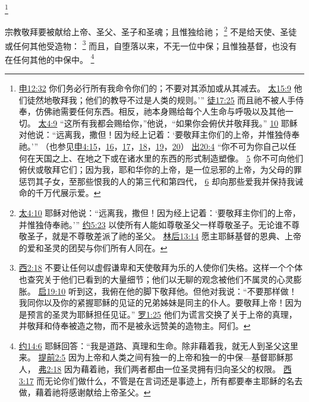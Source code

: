 \documentclass[12pt, a4paper, oneside]{ctexart}
\newcounter{parnum}[section]
\newcommand{\N}{%
   \noindent\refstepcounter{parnum}%
    \makebox[\parindent][l]{\textbf{\arabic{parnum}.}}}
\begin{document}
	\footnote {
		\href{https://biblehub.com/deuteronomy/12-32.htm}{申12:32} 你们务必行所有我命令你们的；不要对其添加或从其减去。
		\href{https://biblehub.com/matthew/15-9.htm}{太15:9} 他们徒然地敬拜我；他们的教导不过是人类的规则。’”
		\href{https://biblehub.com/acts/17-25.htm}{徒17:25} 而且祂不被人手侍奉，仿佛祂需要任何东西。相反，祂本身赐给每个人生命与呼吸以及其他一切。
		\href{https://biblehub.com/matthew/4-9.htm}{太4:9} “这所有我都会赐给你，”他说，“如果你会俯伏并敬拜我。”
		\href{https://biblehub.com/matthew/4-10.htm}{10} 耶稣对他说：“远离我，撒但！因为经上记着：‘要敬拜主你们的上帝，并惟独侍奉祂。’”
		（也参见\href{https://biblehub.com/deuteronomy/4-15.htm}{申4:15}，\href{https://biblehub.com/deuteronomy/4-16.htm}{16}，\href{https://biblehub.com/deuteronomy/4-17.htm}{17}，\href{https://biblehub.com/deuteronomy/4-18.htm}{18}，\href{https://biblehub.com/deuteronomy/4-19.htm}{19}，\href{https://biblehub.com/deuteronomy/4-20.htm}{20}）
		\href{https://biblehub.com/exodus/20-4.htm}{出20:4} “你不可为你自己以任何在天国之上、在地之下或在诸水里的东西的形式制造塑像。
		\href{https://biblehub.com/exodus/20-5.htm}{5} 你不可向他们俯伏或敬拜它们；因为我，耶和华你的上帝，是一位忌邪的上帝，为父母的罪惩罚其子女，至那些恨我的人的第三代和第四代，
		\href{https://biblehub.com/exodus/20-6.htm}{6} 却向那些爱我并保持我诫命的千万代展示爱。
	}

\N 宗教敬拜要被献给上帝、圣父、圣子和圣魂；且惟独给祂；
	\footnote {
		\href{https://biblehub.com/matthew/4-10.htm}{太4:10} 耶稣对他说：“远离我，撒但！因为经上记着：‘要敬拜主你们的上帝，并惟独侍奉祂。’”
		\href{https://biblehub.com/john/5-23.htm}{约5:23} 以使所有人能如尊敬圣父一样尊敬圣子。无论谁不尊敬圣子，就是不尊敬差派了祂的圣父。
		\href{https://biblehub.com/2_corinthians/13-14.htm}{林后13:14} 愿主耶稣基督的恩典、上帝的爱和圣灵的团契与你们所有人同在。
	}
	不是给天使、圣徒或任何其他受造物：
	\footnote {
		\href{https://biblehub.com/colossians/2-18.htm}{西2:18} 不要让任何以虚假谦卑和天使敬拜为乐的人使你们失格。这样一个个体也查究关于他们已看到的大量细节；他们以无聊的观念被他们不属灵的心灵膨胀。
		\href{https://biblehub.com/revelation/19-10.htm}{启19:10} 听到这，我俯在他的脚下敬拜他。但他对我说：“不要那样做！我同你以及你的紧握耶稣的见证的兄弟姊妹是同主的仆人。要敬拜上帝！因为是预言的圣灵为耶稣担任见证。”
		\href{https://biblehub.com/romans/1-25.htm}{罗1:25} 他们为谎言交换了关于上帝的真理，并敬拜和侍奉被造之物，而不是被永远赞美的造物主。阿们。
	}
	而且，自堕落以来，不无一位中保；且惟独基督，也没有在任何其他的中保中。
	\footnote {
		\href{https://biblehub.com/john/14-6.htm}{约14:6} 耶稣回答：“我是道路、真理和生命。除非藉着我，就无人到圣父这里来。
		\href{https://biblehub.com/1_timothy/2-5.htm}{提前2:5} 因为上帝和人类之间有独一的上帝和独一的中保---基督耶稣那人，
		\href{https://biblehub.com/ephesians/2-18.htm}{弗2:18} 因为藉着祂，我们两者都由一位圣灵拥有归向圣父的权限。
		\href{https://biblehub.com/colossians/3-17.htm}{西3:17} 而无论你们做什么，不管是在言词还是事迹上，所有都要奉主耶稣的名去做，藉着祂将感谢献给上帝圣父。
	}
\end{document}

